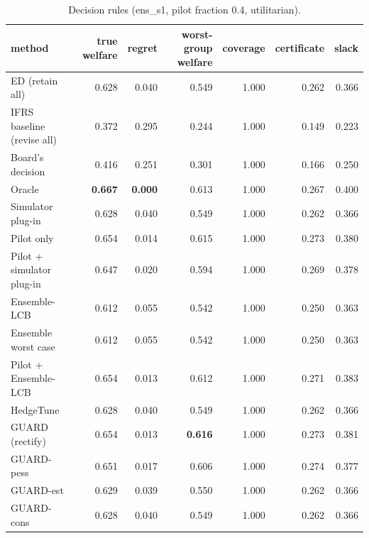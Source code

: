 \begin{table}[t]
\centering
\small
\begin{tabular}{lrrrrrr}
\toprule
method & true welfare & regret & worst-group welfare & coverage & certificate & slack \\
\midrule
ED (retain all) & 0.628 & 0.040 & 0.549 & 1.000 & 0.262 & 0.366 \\
IFRS baseline (revise all) & 0.372 & 0.295 & 0.244 & 1.000 & 0.149 & 0.223 \\
Board's decision & 0.416 & 0.251 & 0.301 & 1.000 & 0.166 & 0.250 \\
Oracle & \textbf{0.667} & \textbf{0.000} & 0.613 & 1.000 & 0.267 & 0.400 \\
Simulator plug-in & 0.628 & 0.040 & 0.549 & 1.000 & 0.262 & 0.366 \\
Pilot only & 0.654 & 0.014 & 0.615 & 1.000 & 0.273 & 0.380 \\
Pilot + simulator plug-in & 0.647 & 0.020 & 0.594 & 1.000 & 0.269 & 0.378 \\
Ensemble-LCB & 0.612 & 0.055 & 0.542 & 1.000 & 0.250 & 0.363 \\
Ensemble worst case & 0.612 & 0.055 & 0.542 & 1.000 & 0.250 & 0.363 \\
Pilot + Ensemble-LCB & 0.654 & 0.013 & 0.612 & 1.000 & 0.271 & 0.383 \\
HedgeTune & 0.628 & 0.040 & 0.549 & 1.000 & 0.262 & 0.366 \\
GUARD (rectify) & 0.654 & 0.013 & \textbf{0.616} & 1.000 & 0.273 & 0.381 \\
GUARD-pess & 0.651 & 0.017 & 0.606 & 1.000 & 0.274 & 0.377 \\
GUARD-est & 0.629 & 0.039 & 0.550 & 1.000 & 0.262 & 0.366 \\
GUARD-cons & 0.628 & 0.040 & 0.549 & 1.000 & 0.262 & 0.366 \\
\bottomrule
\end{tabular}
\caption{Decision rules (ens\_s1, pilot fraction 0.4, utilitarian).}
\label{tab:methods-utilitarian}
\end{table}
